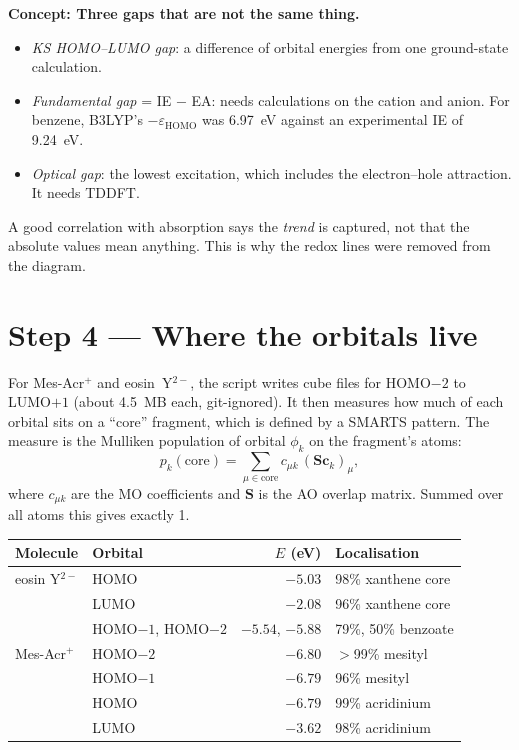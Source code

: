 \documentclass[11pt,a4paper]{article}
\newcommand{\notehead}[2]{\par\smallskip\noindent\textbf{#1: #2.}\enspace}
\begin{document}
\notehead{Concept}{Three gaps that are not the same thing}
\begin{itemize}[leftmargin=*]
  \item \emph{KS HOMO--LUMO gap}: a difference of orbital energies from one ground-state
  calculation.
  \item \emph{Fundamental gap} = IE $-$ EA: needs calculations on the cation and anion. For
  benzene, B3LYP's $-\varepsilon_\text{HOMO}$ was 6.97~eV against an experimental IE of 9.24~eV.
  \item \emph{Optical gap}: the lowest excitation, which includes the electron--hole attraction.
  It needs TDDFT.
\end{itemize}
A good correlation with absorption says the \emph{trend} is captured, not that the absolute values
mean anything. This is why the redox lines were removed from the diagram.
\par\smallskip

\section{Step 4 --- Where the orbitals live}

For Mes-Acr$^+$ and eosin~Y$^{2-}$, the script writes cube files for HOMO$-2$ to LUMO$+1$ (about
4.5~MB each, git-ignored). It then measures how much of each orbital sits on a ``core'' fragment,
which is defined by a SMARTS pattern. The measure is the Mulliken population of orbital
$\phi_k$ on the fragment's atoms:
\[
  p_k(\text{core}) = \sum_{\mu \in \text{core}} c_{\mu k}\,(\mathbf{S}\mathbf{c}_k)_\mu ,
\]
where $c_{\mu k}$ are the MO coefficients and $\mathbf{S}$ is the AO overlap matrix. Summed over
all atoms this gives exactly 1.

\begin{center}\small
\begin{tabular}{@{}llrl@{}}
\toprule
Molecule & Orbital & $E$ (eV) & Localisation \\
\midrule
eosin Y$^{2-}$ & HOMO & $-5.03$ & 98\% xanthene core \\
 & LUMO & $-2.08$ & 96\% xanthene core \\
 & HOMO$-1$, HOMO$-2$ & $-5.54$, $-5.88$ & 79\%, 50\% benzoate \\
Mes-Acr$^+$ & HOMO$-2$ & $-6.80$ & $>$99\% mesityl \\
 & HOMO$-1$ & $-6.79$ & 96\% mesityl \\
 & HOMO & $-6.79$ & 99\% acridinium \\
 & LUMO & $-3.62$ & 98\% acridinium \\
\bottomrule
\end{tabular}
\end{center}
\end{document}
